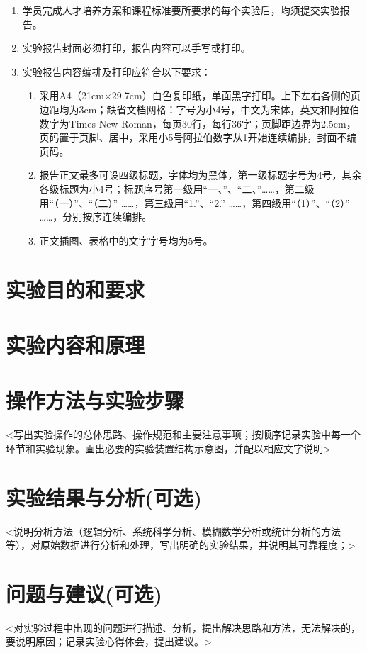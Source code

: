 \documentclass[a4paper,12pt]{article}
\begin{document}
\vspace*{1\baselineskip} 

\begin{enumerate}
\songti{}
\item 学员完成人才培养方案和课程标准要所要求的每个实验后，均须提交实验报告。
\item 实验报告封面必须打印，报告内容可以手写或打印。
\item 实验报告内容编排及打印应符合以下要求：
    \begin{enumerate}
    \fangsong{}
    \item 采用A4（21cm×29.7cm）白色复印纸，单面黑字打印。上下左右各侧的页边距均为3cm；缺省文档网格：字号为小4号，中文为宋体，英文和阿拉伯数字为Times New Roman，每页30行，每行36字；页脚距边界为2.5cm，页码置于页脚、居中，采用小5号阿拉伯数字从1开始连续编排，封面不编页码。
    \item 报告正文最多可设四级标题，字体均为黑体，第一级标题字号为4号，其余各级标题为小4号；标题序号第一级用“一、”、“二、”……，第二级用“（一）”、“（二）” ……，第三级用“1.”、“2.” ……，第四级用“（1）”、“（2）” ……，分别按序连续编排。
    \item 正文插图、表格中的文字字号均为5号。
    \end{enumerate}
\end{enumerate}

\newpage

\section{实验目的和要求}


\section{实验内容和原理}


\section{操作方法与实验步骤}
<写出实验操作的总体思路、操作规范和主要注意事项；按顺序记录实验中每一个环节和实验现象。画出必要的实验装置结构示意图，并配以相应文字说明>


\section{实验结果与分析(可选)}
<说明分析方法（逻辑分析、系统科学分析、模糊数学分析或统计分析的方法等），对原始数据进行分析和处理，写出明确的实验结果，并说明其可靠程度；>



\section{问题与建议(可选)}
<对实验过程中出现的问题进行描述、分析，提出解决思路和方法，无法解决的，要说明原因；记录实验心得体会，提出建议。>
\end{document}
